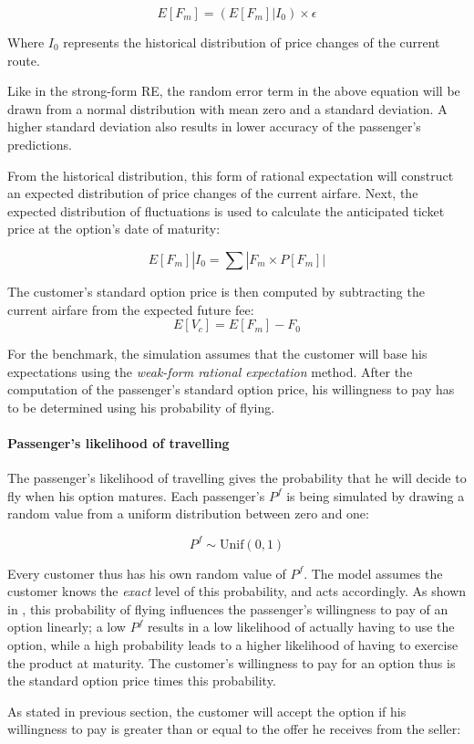 $$ E[F_m] = (E[F_m] | I_0) \times \epsilon $$

Where $I_0$ represents the historical distribution of price changes of the current route.

Like in the strong-form RE, the random error term in the above equation will be drawn from a normal distribution with mean zero and a standard deviation. A higher standard deviation also results in lower accuracy of the passenger's predictions.

From the historical distribution, this form of rational expectation will construct an expected distribution of price changes of the current airfare. Next, the expected distribution of fluctuations is used to calculate the anticipated ticket price at the option's date of maturity:

$$ E[F_m] | I_0 = \sum |F_m \times P[F_m]| $$

The customer's standard option price is then computed by subtracting the current airfare from the expected future fee:
$$ E[V_c] = E[F_m] - F_0 $$

For the benchmark, the simulation assumes that the customer will base his expectations using the \emph{weak-form rational expectation} method. After the computation of the passenger's standard option price, his willingness to pay has to be determined using his probability of flying.

\paragraph{Passenger's likelihood of travelling}
The passenger's likelihood of travelling gives the probability that he will decide to fly when his option matures. Each passenger's $P^f$ is being simulated by drawing a random value from a uniform distribution between zero and one:

$$ P^f \sim \mbox{Unif}(0, 1)$$

Every customer thus has his own random value of $P^f$. The model assumes the customer knows the \emph{exact} level of this probability, and acts accordingly. As shown in , this probability of flying influences the passenger's willingness to pay of an option linearly; a low $P^f$ results in a low likelihood of actually having to use the option, while a high probability leads to a higher likelihood of having to exercise the product at maturity. The customer's willingness to pay for an option thus is the standard option price times this probability.

As stated in previous section, the customer will accept the option if his willingness to pay is greater than or equal to the offer he receives from the seller:

